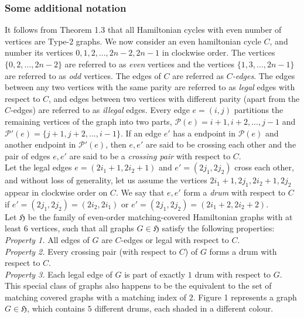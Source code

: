 \documentclass[11pt]{article}
\begin{document}
\subsubsection*{Some additional notation}
It follows from Theorem 1.3 that all Hamiltonian cycles with even number of vertices are Type-$2$ graphs. We now consider an even hamiltonian cycle $C$, and number its vertices $0,1,2,...,2n-2,2n-1$ in clockwise order. The vertices $\{0,2,...,2n-2\}$ are referred to as \textit{even} vertices and the vertices $\{1,3,...,2n-1\}$ are referred to as \textit{odd} vertices. The edges of $C$ are referred as \textit{$C$-edges}. The edges between any two vertices with the same parity are referred to as \textit{legal} edges with respect to $C$, and edges between two vertices with different parity (apart from the $C$-edges) are referred to as \textit{illegal} edges. Every edge $e=(i,j)$ partitions the remaining vertices of the graph into two parts, $\mathcal{P}(e)={i+1,i+2,...,j-1}$ and $\mathcal{P}'(e)=\{j+1,j+2,...,i-1\}$. If an edge $e'$ has a endpoint in $\mathcal{P}(e)$ and another endpoint in $\mathcal{P}'(e)$, then $e,e'$ are said to be crossing each other and the pair of edges $e,e'$ are said to be a \textit{crossing pair} with respect to $C$.\\
Let the legal edges $e=(2i_1+1,2i_2+1)$ and $e'=(2j_1,2j_2)$ cross each other, and without loss of generality, let us assume the vertices $2i_1+1,2j_1,2i_2+1,2j_2$ appear in clockwise order on $C$. We say that $e,e'$ form a \textit{drum} with respect to $C$ if $e'=(2j_1,2j_2)=(2i_2,2i_1)$ or $e'=(2j_1,2j_2)=(2i_1+2,2i_2+2)$. \medskip\\
Let $\mathfrak{H}$ be the family of even-order matching-covered Hamiltonian graphs with at least $6$ vertices, such that all graphs $G \in \mathfrak{H}$ satisfy the following properties:\\
\textit{Property 1.} All edges of $G$ are $C$-edges or legal with respect to $C$.\\
\textit{Property 2.} Every crossing pair (with respect to $C$) of $G$ forms a drum with respect to $C$.\\
\textit{Property 3.} Each legal edge of $G$ is part of exactly $1$ drum with respect to $G$.\\
This special class of graphs also happens to be the equivalent to the set of matching covered graphs with a matching index of $2$. Figure 1 represents a graph $G \in \mathfrak{H}$, which contains $5$ different drums, each shaded in a different colour.\\
\end{document}
